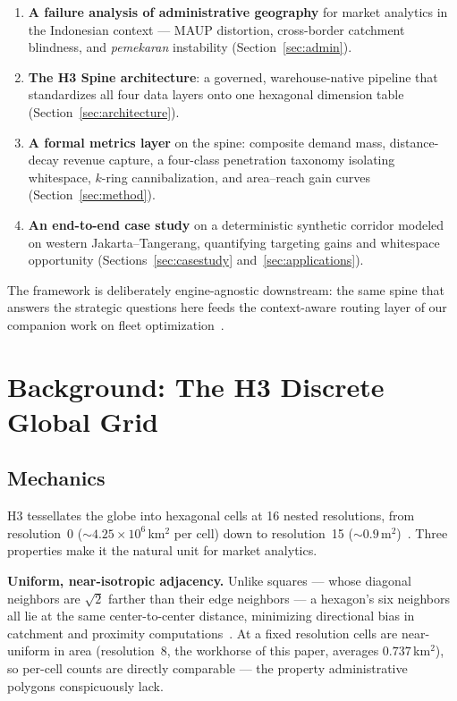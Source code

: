 \documentclass[11pt,a4paper,twocolumn]{article}
\begin{document}
\begin{enumerate}[leftmargin=1.4em, itemsep=0.15em]
  \item \textbf{A failure analysis of administrative geography} for market
    analytics in the Indonesian context --- MAUP distortion, cross-border
    catchment blindness, and \emph{pemekaran} instability
    (Section~\ref{sec:admin}).
  \item \textbf{The H3 Spine architecture}: a governed, warehouse-native
    pipeline that standardizes all four data layers onto one hexagonal
    dimension table (Section~\ref{sec:architecture}).
  \item \textbf{A formal metrics layer} on the spine: composite demand
    mass, distance-decay revenue capture, a four-class penetration
    taxonomy isolating whitespace, $k$-ring cannibalization, and
    area--reach gain curves (Section~\ref{sec:method}).
  \item \textbf{An end-to-end case study} on a deterministic synthetic
    corridor modeled on western Jakarta--Tangerang, quantifying targeting
    gains and whitespace opportunity (Sections~\ref{sec:casestudy}
    and~\ref{sec:applications}).
\end{enumerate}

The framework is deliberately engine-agnostic downstream: the same spine
that answers the strategic questions here feeds the context-aware routing
layer of our companion work on fleet optimization~\cite{terra2026}.

\section{Background: The H3 Discrete Global Grid}
\label{sec:background}

\subsection{Mechanics}

H3 tessellates the globe into hexagonal cells at 16 nested resolutions,
from resolution~0 (${\sim}4.25 \times 10^6$\,km$^2$ per cell) down to
resolution~15 (${\sim}0.9$\,m$^2$)~\cite{h3docs}. Three properties make it
the natural unit for market analytics.

\textbf{Uniform, near-isotropic adjacency.} Unlike squares --- whose
diagonal neighbors are $\sqrt{2}$ farther than their edge neighbors --- a
hexagon's six neighbors all lie at the same center-to-center distance,
minimizing directional bias in catchment and proximity
computations~\cite{esriwhyhex}. At a fixed resolution cells are
near-uniform in area (resolution~8, the workhorse of this paper, averages
$0.737$\,km$^2$), so per-cell counts are directly comparable --- the
property administrative polygons conspicuously lack.
\end{document}
